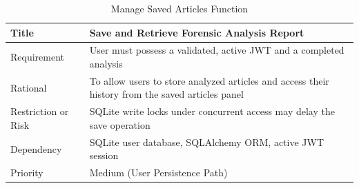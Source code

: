 \begin{table}[h!]
    \begin{tabularx}{\textwidth}{|l|X|}
        \hline
        Title & Save and Retrieve Forensic Analysis Report \\
        \hline
        Requirement & User must possess a validated, active JWT and a completed analysis \\
        \hline
        Rational & To allow users to store analyzed articles and access their history from the saved articles panel \\
        \hline
        Restriction or Risk & SQLite write locks under concurrent access may delay the save operation \\
        \hline
        Dependency & SQLite user database, SQLAlchemy ORM, active JWT session \\
        \hline
        Priority & Medium (User Persistence Path) \\
        \hline
    \end{tabularx}
    \caption{Manage Saved Articles Function}
    \label{tab:table_save_article_function}
\end{table}

